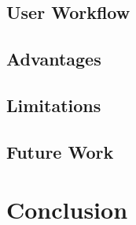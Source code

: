 \subsection{User Workflow}


\subsection{Advantages}


\subsection{Limitations}


\subsection{Future Work}


\section{Conclusion}









